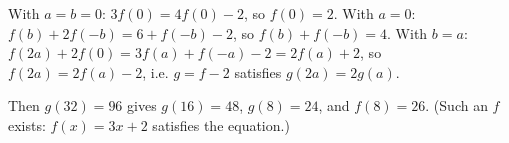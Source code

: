 With $a=b=0$: $3f(0)=4f(0)-2$, so $f(0)=2$. With $a=0$: $f(b)+2f(-b)=6+f(-b)-2$, so $f(b)+f(-b)=4$. With $b=a$: $f(2a)+2f(0)=3f(a)+f(-a)-2=2f(a)+2$, so $f(2a)=2f(a)-2$, i.e. $g=f-2$ satisfies $g(2a)=2g(a)$.

Then $g(32)=96$ gives $g(16)=48$, $g(8)=24$, and $f(8)=\boxed{26}$. (Such an $f$ exists: $f(x)=3x+2$ satisfies the equation.)
